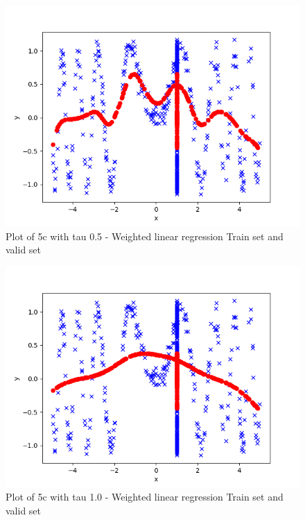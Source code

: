 \begin{answer}
\begin{figure}
  \includegraphics[width=\linewidth]{../src/output/p05c_plot_0_5_tau.png}
  \caption{Plot of 5c with tau 0.5 - Weighted linear regression Train set and valid set}
  \label{fig:Plot of 5c with tau 0.5 - Weighted linear regression Train set and valid set}
\end{figure}
\begin{figure}
  \includegraphics[width=\linewidth]{../src/output/p05c_plot_1_0_tau.png}
  \caption{Plot of 5c with tau 1.0 - Weighted linear regression Train set and valid set}
  \label{fig:Plot of 5c with tau 1.0 - Weighted linear regression Train set and valid set}
\end{figure}
\begin{figure}

\end{figure}
\end{answer}
